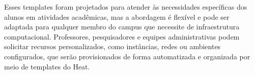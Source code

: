 Esses templates foram projetados para atender às necessidades específicas dos alunos em atividades acadêmicas, mas a abordagem é flexível e pode ser adaptada para qualquer membro do campus que necessite de infraestrutura computacional. Professores, pesquisadores e equipes administrativas podem solicitar recursos personalizados, como instâncias, redes ou ambientes configurados, que serão provisionados de forma automatizada e organizada por meio de templates do Heat.